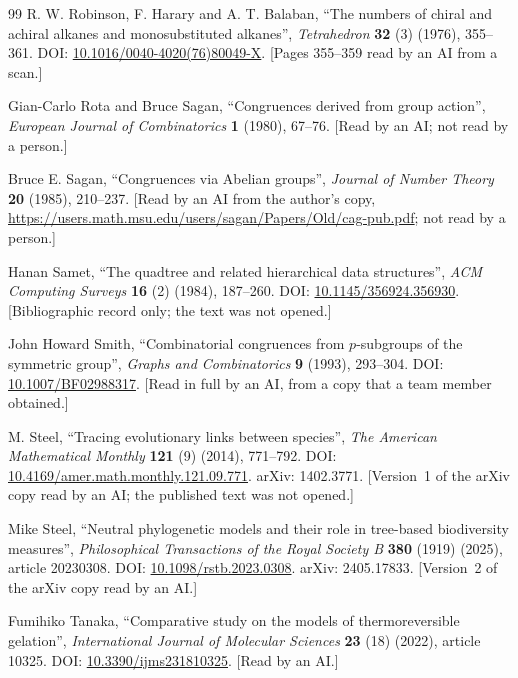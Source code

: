 \documentclass[11pt]{article}
\theoremstyle{definition}
\theoremstyle{remark}
\numberwithin{equation}{section}
\numberwithin{figure}{section}
\begin{document}
\begin{thebibliography}{99}
R. W. Robinson, F. Harary and A. T. Balaban, ``The numbers of chiral and achiral alkanes and monosubstituted
alkanes'', \emph{Tetrahedron} \textbf{32} (3) (1976), 355--361. DOI:
\href{https://doi.org/10.1016/0040-4020(76)80049-X}{10.1016/0040-4020(76)80049-X}. [Pages 355--359 read by an
AI from a scan.]

Gian-Carlo Rota and Bruce Sagan, ``Congruences derived from group action'', \emph{European Journal of
Combinatorics} \textbf{1} (1980), 67--76. [Read by an AI; not read by a person.]

Bruce E. Sagan, ``Congruences via Abelian groups'', \emph{Journal of Number Theory} \textbf{20} (1985),
210--237. [Read by an AI from the author's copy,
\url{https://users.math.msu.edu/users/sagan/Papers/Old/cag-pub.pdf}; not read by a person.]

Hanan Samet, ``The quadtree and related hierarchical data structures'', \emph{ACM Computing Surveys}
\textbf{16} (2) (1984), 187--260. DOI: \href{https://doi.org/10.1145/356924.356930}{10.1145/356924.356930}.
[Bibliographic record only; the text was not opened.]

John Howard Smith, ``Combinatorial congruences from $p$-subgroups of the symmetric group'', \emph{Graphs and
Combinatorics} \textbf{9} (1993), 293--304. DOI:
\href{https://doi.org/10.1007/BF02988317}{10.1007/BF02988317}. [Read in full by an AI, from a copy that a
team member obtained.]

M. Steel, ``Tracing evolutionary links between species'', \emph{The American Mathematical Monthly}
\textbf{121} (9) (2014), 771--792. DOI:
\href{https://doi.org/10.4169/amer.math.monthly.121.09.771}{10.4169/amer.math.monthly.121.09.771}. arXiv:
1402.3771. [Version~1 of the arXiv copy read by an AI; the published text was not opened.]

Mike Steel, ``Neutral phylogenetic models and their role in tree-based biodiversity measures'',
\emph{Philosophical Transactions of the Royal Society B} \textbf{380} (1919) (2025), article 20230308. DOI:
\href{https://doi.org/10.1098/rstb.2023.0308}{10.1098/rstb.2023.0308}. arXiv: 2405.17833. [Version~2 of the
arXiv copy read by an AI.]

Fumihiko Tanaka, ``Comparative study on the models of thermoreversible gelation'', \emph{International
Journal of Molecular Sciences} \textbf{23} (18) (2022), article 10325. DOI:
\href{https://doi.org/10.3390/ijms231810325}{10.3390/ijms231810325}. [Read by an AI.]


\end{thebibliography}
\end{document}
